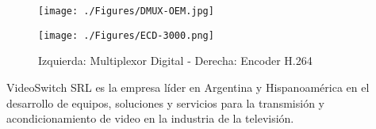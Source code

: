 \vspace{1cm}
\begin{figure}[htbp]
    \centering
    \begin{minipage}{.45\linewidth}
        \texttt{[image: ./Figures/DMUX-OEM.jpg]}
    \end{minipage}
    \hspace{.05\linewidth}
    \begin{minipage}{.45\linewidth}
        \texttt{[image: ./Figures/ECD-3000.png]}
    \end{minipage}
    \caption{Izquierda: Multiplexor Digital - Derecha: Encoder H.264}
        \label{fig:vs-mux-ecd}
\end{figure}
\vspace{1cm}

VideoSwitch SRL \citep{vs-srl} es la empresa líder en Argentina y Hispanoamérica
en el desarrollo de equipos, soluciones y servicios para la transmisión y
acondicionamiento de video en la industria de la televisión.
